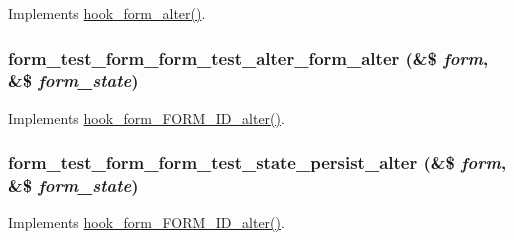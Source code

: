 \label{form__test_8module_afc7a8dae00439af9b34292e9688702fa}
Implements \hyperlink{group__hooks_ga6df3cea27ae1407aeef4eae5444cb213}{hook\_\-form\_\-alter()}. \hypertarget{form__test_8module_ad94a51a83fd9967f9388f7e7a6f03d99}{
\subsubsection[{form\_\-test\_\-form\_\-form\_\-test\_\-alter\_\-form\_\-alter}]{\setlength{\rightskip}{0pt plus 5cm}form\_\-test\_\-form\_\-form\_\-test\_\-alter\_\-form\_\-alter (\&\$ {\em form}, \/  \&\$ {\em form\_\-state})}}
\label{form__test_8module_ad94a51a83fd9967f9388f7e7a6f03d99}
Implements \hyperlink{group__hooks_ga8d4a4089551493d55911bd5c4f218264}{hook\_\-form\_\-FORM\_\-ID\_\-alter()}. \hypertarget{form__test_8module_a162833daaa3fe9628e839c4e0ac56fde}{
\subsubsection[{form\_\-test\_\-form\_\-form\_\-test\_\-state\_\-persist\_\-alter}]{\setlength{\rightskip}{0pt plus 5cm}form\_\-test\_\-form\_\-form\_\-test\_\-state\_\-persist\_\-alter (\&\$ {\em form}, \/  \&\$ {\em form\_\-state})}}
\label{form__test_8module_a162833daaa3fe9628e839c4e0ac56fde}
Implements \hyperlink{group__hooks_ga8d4a4089551493d55911bd5c4f218264}{hook\_\-form\_\-FORM\_\-ID\_\-alter()}.

